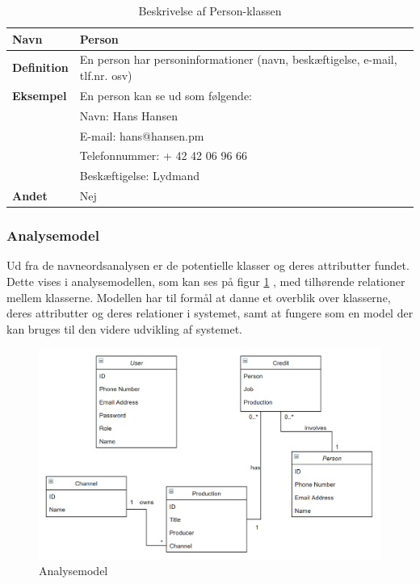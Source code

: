 \begin{table}[ht]
    \begin{tabularx}{\textwidth}{|p{3cm}|X|}
        \hline
        \textbf{Navn} &  Person\\
        \hline
        \textbf{Definition} &  En person har personinformationer (navn, beskæftigelse, e-mail, tlf.nr. osv)\\
        \hline
        \textbf{Eksempel} & En person kan se ud som følgende: \\
                          & Navn: Hans Hansen\\
                          & E-mail: hans@hansen.pm\\
                          & Telefonnummer: + 42 42 06 96 66\\
                          & Beskæftigelse: Lydmand\\
        \hline
        \textbf{Andet} & Nej\\
        \hline
    \end{tabularx}
    \caption{Beskrivelse af Person-klassen}
    \label{tab:person_class_description}
\end{table}

\subsubsection{Analysemodel}
Ud fra de navneordsanalysen er de potentielle klasser og deres attributter fundet. Dette vises i analysemodellen, som kan ses på figur \ref{fig:analysemodel} , med tilhørende relationer mellem klasserne. Modellen har til formål at danne et overblik over klasserne, deres attributter og deres relationer i systemet, samt at fungere som en model der kan bruges til den videre udvikling af systemet. \\


\begin{figure}[h]
\centering
\includegraphics[scale=0.43]{figures/analysemodel.png}
\caption{Analysemodel}
\label{fig:analysemodel}
\end{figure}
